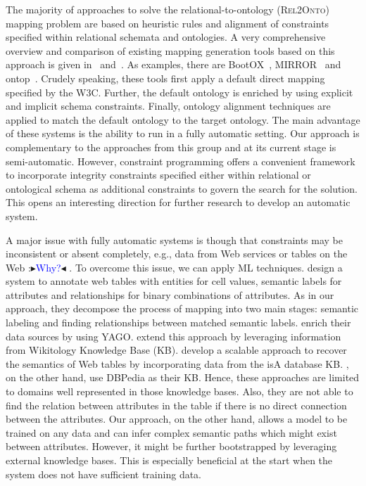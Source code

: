\documentclass[letterpaper]{article} %
\newcommand{\authornote}[3]{
  {\fbox{\sc 
  #1}:$\blacktriangleright$\textcolor{#2}{\small{#3}}$\blacktriangleleft$}%
}
\newcommand{\ddg}[1]{\authornote{DDG}{blue}{#1}}
\newcommand{\relonto}{\textsc{Rel2Onto}}
\begin{document}
The majority of approaches to solve the relational-to-ontology (\relonto{}) mapping problem are based on heuristic rules and alignment of constraints specified within relational schemata and ontologies.
A very comprehensive overview and comparison of existing mapping generation tools based on this approach is given in~\cite{Pinkel:rodi} and~\cite{Spanos:semweb}.
As examples, there are BootOX~\cite{Jimenez:Bootox}, MIRROR~\cite{Luciano:Mirror} and  ontop~\cite{Fagin:Clio}.
Crudely speaking, these tools first apply a default direct mapping specified by the W3C.
Further, the default ontology is enriched by using explicit and implicit schema constraints.
Finally, ontology alignment techniques are applied to match the default ontology to the target ontology.
The main advantage of these systems is the ability to run in a fully automatic setting.
Our approach is complementary to the approaches from this group and at its current stage is semi-automatic.
However, constraint programming offers a convenient framework to incorporate integrity constraints specified either within relational or ontological schema as additional constraints to govern the search for the solution.
This opens an interesting direction for further research to develop an automatic system.

A major issue with fully automatic systems is though that constraints may be inconsistent or absent completely, e.g., data from Web services or tables on the Web \ddg{Why?}.
To overcome this issue, we can apply ML techniques.
\cite{Limaye:Annotating} design a system to annotate web tables with entities for cell values, semantic labels for attributes and relationships for binary combinations of attributes.
As in our approach, they decompose the process of mapping into two main stages: semantic labeling and finding relationships between matched semantic labels.
\cite{Limaye:Annotating} enrich their data sources by using YAGO.
\cite{Mulwad:Semantic} extend this approach by leveraging information from Wikitology Knowledge Base (KB).
\cite{Venetis:Recovering} develop a scalable approach to recover the semantics of Web tables by incorporating data from the isA database KB.
\cite{Ritze:matching}, on the other hand, use DBPedia as their KB.
Hence, these approaches are limited to domains well represented in those knowledge bases.
Also, they are not able to find the relation between attributes in the table if there is no direct connection between the attributes.
Our approach, on the other hand, allows a model to be trained on any data and can infer complex semantic paths which might exist between attributes.
However, it might be further bootstrapped by leveraging external knowledge bases.
This is especially beneficial at the start when the system does not have sufficient training data.
\end{document}
